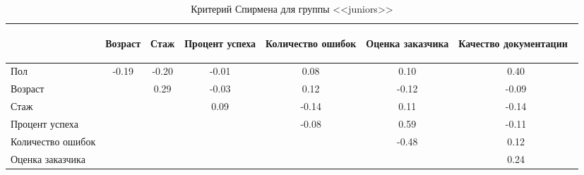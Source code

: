 \begin{table}[H]
	\centering
	\caption{Критерий Спирмена для группы <<juniors>>}
	\begin{tabular}{|l|c|c|c|c|c|c|}
		\hline
		& 
		\begin{sideways}
			Возраст
		\end{sideways}  & 
		\begin{sideways}
			Стаж
		\end{sideways} & 
		\begin{sideways}
			Процент успеха
		\end{sideways} & 
		\begin{sideways}
			Количество ошибок
		\end{sideways} &
		\begin{sideways}
			Оценка заказчика
		\end{sideways} & 
		\begin{sideways}
			Качество документации~
		\end{sideways} \\ \hline
		Пол                   & -0.19 & -0.20 & -0.01 & 0.08 & 0.10 & 0.40 \\ \hline
		Возраст               &&  0.29 & -0.03 &  0.12 & -0.12 & -0.09 \\ \hline	
		Стаж                  &&&  0.09 & -0.14 &  0.11 & -0.14 \\ \hline
		Процент успеха        &&&& -0.08 &  0.59 & -0.11 \\ \hline
		Количество ошибок     &&&&& -0.48 &  0.12 \\ \hline	
		Оценка заказчика      &&&&&&  0.24 \\ \hline	
	\end{tabular}
	\label{jun/s}
\end{table}


